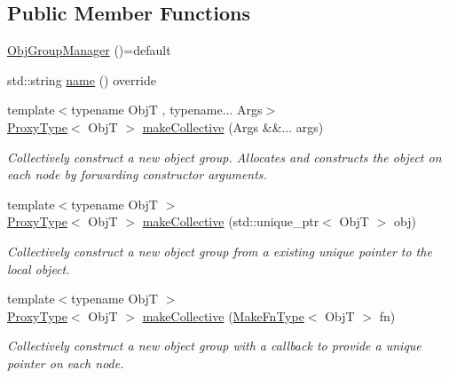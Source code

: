 \subsection*{Public Member Functions}
\begin{DoxyCompactItemize}
\item 
\hyperlink{structvt_1_1objgroup_1_1_obj_group_manager_a2de45aef25bff09a2fafabe227aa0ee7}{Obj\+Group\+Manager} ()=default
\item 
std\+::string \hyperlink{structvt_1_1objgroup_1_1_obj_group_manager_a92c0b07c2d90063c40087f625880cca3}{name} () override
\item 
{\footnotesize template$<$typename ObjT , typename... Args$>$ }\\\hyperlink{structvt_1_1objgroup_1_1_obj_group_manager_aea65eef52f240a52210132eef5ce591f}{Proxy\+Type}$<$ ObjT $>$ \hyperlink{structvt_1_1objgroup_1_1_obj_group_manager_a651c44a47c6bcdc9f1b6c9e857fa03f2}{make\+Collective} (Args \&\&... args)
\begin{DoxyCompactList}\small\item\em Collectively construct a new object group. Allocates and constructs the object on each node by forwarding constructor arguments. \end{DoxyCompactList}\item 
{\footnotesize template$<$typename ObjT $>$ }\\\hyperlink{structvt_1_1objgroup_1_1_obj_group_manager_aea65eef52f240a52210132eef5ce591f}{Proxy\+Type}$<$ ObjT $>$ \hyperlink{structvt_1_1objgroup_1_1_obj_group_manager_ac1c2489611d2064b89b65b90059b2c4b}{make\+Collective} (std\+::unique\+\_\+ptr$<$ ObjT $>$ obj)
\begin{DoxyCompactList}\small\item\em Collectively construct a new object group from a existing unique pointer to the local object. \end{DoxyCompactList}\item 
{\footnotesize template$<$typename ObjT $>$ }\\\hyperlink{structvt_1_1objgroup_1_1_obj_group_manager_aea65eef52f240a52210132eef5ce591f}{Proxy\+Type}$<$ ObjT $>$ \hyperlink{structvt_1_1objgroup_1_1_obj_group_manager_a34d75d825c84636cd9c13f6185243414}{make\+Collective} (\hyperlink{structvt_1_1objgroup_1_1_obj_group_manager_a397d787b3876752a6d70511b2769b872}{Make\+Fn\+Type}$<$ ObjT $>$ fn)
\begin{DoxyCompactList}\small\item\em Collectively construct a new object group with a callback to provide a unique pointer on each node. \end{DoxyCompactList}\item 

\end{DoxyCompactItemize}
